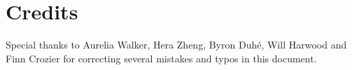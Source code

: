 \section{Credits}

Special thanks to Aurelia Walker, Hera Zheng, Byron Duh\'{e}, Will Harwood and Finn Crozier for correcting several mistakes and typos in this document.